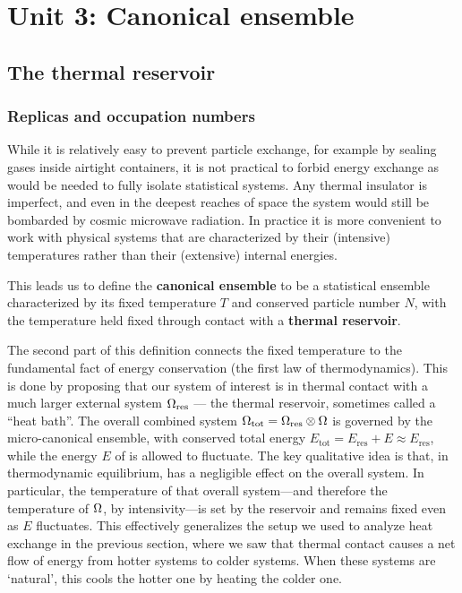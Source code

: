 \renewcommand{\thisunit}{MATH327 Unit 3}
\renewcommand{\moddate}{Last modified 13 Feb.~2022}
\setcounter{section}{3}
\setcounter{subsection}{0}
{}
\section*{Unit 3: Canonical ensemble}
\subsection{\label{sec:reservoir}The thermal reservoir}
\subsubsection{\label{sec:replicas}Replicas and occupation numbers}
While it is relatively easy to prevent particle exchange, for example by sealing gases inside airtight containers, it is not practical to forbid energy exchange as would be needed to fully isolate statistical systems.
Any thermal insulator is imperfect, and even in the deepest reaches of space the system would still be bombarded by cosmic microwave radiation.
In practice it is more convenient to work with physical systems that are characterized by their (intensive) temperatures rather than their (extensive) internal energies.

\begin{shaded}
  This leads us to define the \textbf{canonical ensemble} to be a statistical ensemble characterized by its fixed temperature $T$ and conserved particle number $N$, with the temperature held fixed through contact with a \textbf{thermal reservoir}.
\end{shaded}

The second part of this definition connects the fixed temperature to the fundamental fact of energy conservation (the first law of thermodynamics).
This is done by proposing that our system of interest \Om is in thermal contact with a much larger external system $\Omega_{\text{res}}$ --- the thermal reservoir, sometimes called a ``heat bath''.
The overall combined system $\Omega_{\text{tot}} = \Omega_{\text{res}} \otimes \Omega$ is governed by the micro-canonical ensemble, with conserved total energy $E_{\text{tot}} = E_{\text{res}} + E \approx E_{\text{res}}$, while the energy $E$ of \Om is allowed to fluctuate. %
The key qualitative idea is that, in thermodynamic equilibrium, \Om has a negligible effect on the overall system.
In particular, the temperature of that overall system---and therefore the temperature of $\Omega$, by intensivity---is set by the reservoir and remains fixed even as $E$ fluctuates.
This effectively generalizes the setup we used to analyze heat exchange in the previous section, where we saw that thermal contact causes a net flow of energy from hotter systems to colder systems.
When these systems are `natural', this cools the hotter one by heating the colder one.

